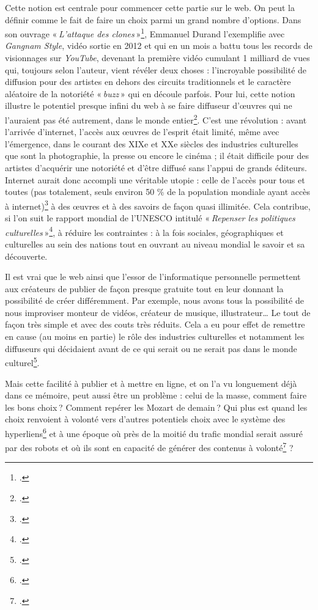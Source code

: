 Cette notion est centrale pour commencer cette partie sur le web. On peut la définir comme le fait de faire un choix parmi un grand nombre d’options. Dans son ouvrage « \textit{L’attaque des clones} »\footcite{durand2016}, Emmanuel Durand l’exemplifie avec \textit{Gangnam Style}, vidéo sortie en 2012 et qui en un mois a battu tous les records de visionnages sur \textit{YouTube}, devenant la première vidéo cumulant 1 milliard de vues qui, toujours selon l’auteur, vient révéler deux choses : l’incroyable possibilité de diffusion pour des artistes en dehors des circuits traditionnels et le caractère aléatoire de la notoriété « \textit{buzz} » qui en découle parfois. Pour lui, cette notion illustre le potentiel presque infini du web à se faire diffuseur d’œuvres qui ne l’auraient pas été autrement, dans le monde entier\footcite[§ 1 et § 4]{durand_chapitre_2016}. C’est une révolution : avant l’arrivée d’internet, l’accès aux œuvres de l’esprit était limité, même avec l’émergence, dans le courant des XIXe et XXe siècles des industries culturelles que sont la photographie, la presse ou encore le cinéma ; il était difficile pour des artistes d’acquérir une notoriété et d’être diffusé sans l’appui de grands éditeurs. Internet aurait donc accompli une véritable utopie : celle de l’accès pour tous et toutes (pas totalement, seuls environ 50 \% de la population mondiale ayant accès à internet)\footcite{2024h} à des œuvres et à des savoirs de façon quasi illimitée. Cela contribue, si l’on suit le rapport mondial de l’UNESCO intitulé « \textit{Repenser les politiques culturelles} »\footcite[cité dans Durand Emmanuel, \textit{l'attaque des clones}... § 10]{zotero-651}, à réduire les contraintes : à la fois sociales, géographiques et culturelles au sein des nations tout en ouvrant au niveau mondial le savoir et sa découverte.

Il est vrai que le web ainsi que l’essor de l’informatique personnelle permettent aux créateurs de publier de façon presque gratuite tout en leur donnant la possibilité de créer différemment. Par exemple, nous avons tous la possibilité de nous improviser monteur de vidéos, créateur de musique, illustrateur… Le tout de façon très simple et avec des couts très réduits. Cela a eu pour effet de remettre en cause (au moins en partie) le rôle des industries culturelles et notamment les diffuseurs qui décidaient avant de ce qui serait ou ne serait pas dans le monde culturel\footcite[§ 19]{durand_chapitre_2016}.

Mais cette facilité à publier et à mettre en ligne, et on l’a vu longuement déjà dans ce mémoire, peut aussi être un problème : celui de la masse, comment faire les bons choix ? Comment repérer les Mozart de demain ? Qui plus est quand les choix renvoient à volonté vers d’autres potentiels choix avec le système des hyperliens\footcite{noauthor_hyperchoix_nodate} et à une époque où près de la moitié du trafic mondial serait assuré par des robots et où ils sont en capacité de générer des contenus à volonté\footcite{ertzscheid2023} ?

